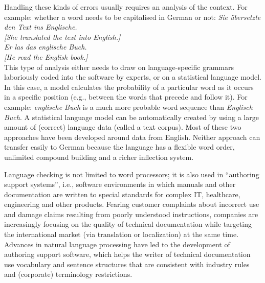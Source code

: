 \documentclass[]{../metanetpaper}
\begin{document}
\begin{Parallel}[c]{80mm}{80mm}
{    Handling these kinds of errors usually requires an analysis of the context. For example: whether a word needs to be capitalised in German or not:
    \textit{Sie übersetzte den Text ins Englische.\\
      {[}She translated the text into English.{]}\\
      Er las das englische Buch.\\
      {[}He read the English book.{]}}\\

    This type of analysis either needs to draw on language-specific grammars laboriously coded into the software by experts, or on a statistical language model. In this case, a model calculates the probability of a particular word as it occurs in a specific position (e.g., between the words that precede and follow it). For example: \textit{englische Buch} is a much more probable word sequence than \textit{Englisch Buch}. A statistical language model can be automatically created by using a large amount of (correct) language data (called a text corpus). Most of these two approaches have been developed around data from English. Neither approach can transfer easily to German because the language has a flexible word order, unlimited compound building and a richer inflection system. 

    Language checking is not limited to word processors; it is also used in “authoring support systems”, i.e., software environments in which manuals and other documentation are written to special standards for complex IT, healthcare, engineering and other products. Fearing customer complaints about incorrect use and damage claims resulting from poorly understood instructions, companies are increasingly focusing on the quality of technical documentation while targeting the international market (via translation or localization) at the same time. Advances in natural language processing have led to the development of authoring support software, which helps the writer of technical documentation use vocabulary and sentence structures that are consistent with industry rules and (corporate) terminology restrictions.

}
\end{Parallel}
\end{document}
